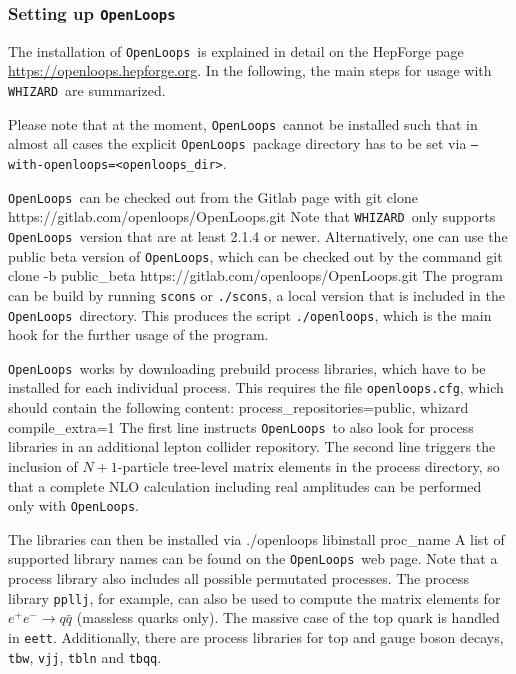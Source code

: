 \documentclass[12pt]{book}
\newenvironment{code}%
  {\begingroup\footnotesize
   \quote
   \Verbatim}%
  {\endVerbatim
   \endquote
   \endgroup\noindent}
\newcommand{\ttt}[1]{\texttt{#1}}
\newcommand{\whizard}{\ttt{WHIZARD}}
\newcommand{\openloops}{\ttt{OpenLoops}}
\begin{document}

\subsubsection{Setting up \openloops}
\label{sec:openloops-setup}

The installation of \openloops\ is explained in detail on the HepForge
page \url{https://openloops.hepforge.org}.  In the following, the main
steps for usage with \whizard\ are summarized.

Please note that at the moment, \openloops\ cannot be installed such
that in almost all cases the explicit \openloops\ package directory
has to be set via \ttt{--with-openloops=<openloops\_dir>}.

\openloops\ can be checked out from the Gitlab page with
\begin{code}
  git clone https://gitlab.com/openloops/OpenLoops.git
\end{code}
Note that \whizard\ only supports \openloops\ version that are at
least 2.1.4 or newer. Alternatively, one can use the public beta
version of \openloops, which can be checked out by the command
\begin{code}
  git clone -b public_beta https://gitlab.com/openloops/OpenLoops.git
\end{code}
The program can be build by running \ttt{scons} or \ttt{./scons}, a
local version that is included in the \openloops\ directory.  This
produces the script \ttt{./openloops}, which is the main hook for the
further usage of the program.

\openloops\ works by downloading prebuild process libraries, which have
to be installed for each individual process. This requires the file
\ttt{openloops.cfg}, which should contain
the following content:
\begin{code}
   [OpenLoops]
   process_repositories=public, whizard
   compile_extra=1
\end{code}
The first line instructs \openloops\ to also look for process libraries
in an additional lepton collider repository.  The second line triggers
the inclusion of $N+1$-particle tree-level matrix elements in the
process directory, so that a complete NLO calculation including real
amplitudes can be performed only with \openloops.

The libraries can then be installed via
\begin{code}
   ./openloops libinstall proc_name
\end{code}
A list of supported library names can be found on the \openloops\ web
page.  Note that a process library also includes all possible permutated
processes.  The process library \ttt{ppllj}, for example, can also be
used to compute the matrix elements for $e^+ e^- \rightarrow q \bar{q}$
(massless quarks only).  The massive case of the top quark is handled in
\ttt{eett}.  Additionally, there are process libraries for top and gauge
boson decays, \ttt{tbw}, \ttt{vjj}, \ttt{tbln} and \ttt{tbqq}.
\end{document}
